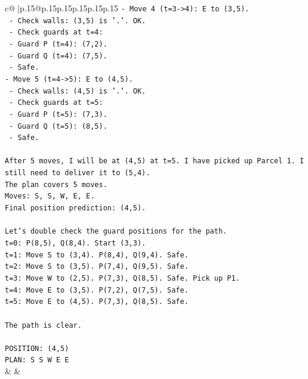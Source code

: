 \documentclass{article}
\begin{document}
{\begin{supertabular}{c@{$\;$}|p{.15\linewidth}@{}p{.15\linewidth}p{.15\linewidth}p{.15\linewidth}p{.15\linewidth}p{.15\linewidth}}
{{{\texttt{{-} Move 4 (t=3{-}>4): E to (3,5).} \\
\texttt{  {-} Check walls: (3,5) is '.'. OK.} \\
\texttt{  {-} Check guards at t=4:} \\
\texttt{    {-} Guard P (t=4): (7,2).} \\
\texttt{    {-} Guard Q (t=4): (7,5).} \\
\texttt{  {-} Safe.} \\
\texttt{{-} Move 5 (t=4{-}>5): E to (4,5).} \\
\texttt{  {-} Check walls: (4,5) is '.'. OK.} \\
\texttt{  {-} Check guards at t=5:} \\
\texttt{    {-} Guard P (t=5): (7,3).} \\
\texttt{    {-} Guard Q (t=5): (8,5).} \\
\texttt{  {-} Safe.} \\
\\ 
\texttt{After 5 moves, I will be at (4,5) at t=5. I have picked up Parcel 1. I still need to deliver it to (5,4).} \\
\texttt{The plan covers 5 moves.} \\
\texttt{Moves: S, S, W, E, E.} \\
\texttt{Final position prediction: (4,5).} \\
\\ 
\texttt{Let's double check the guard positions for the path.} \\
\texttt{t=0: P(8,5), Q(8,4). Start (3,3).} \\
\texttt{t=1: Move S to (3,4). P(8,4), Q(9,4). Safe.} \\
\texttt{t=2: Move S to (3,5). P(7,4), Q(9,5). Safe.} \\
\texttt{t=3: Move W to (2,5). P(7,3), Q(8,5). Safe. Pick up P1.} \\
\texttt{t=4: Move E to (3,5). P(7,2), Q(7,5). Safe.} \\
\texttt{t=5: Move E to (4,5). P(7,3), Q(8,5). Safe.} \\
\\ 
\texttt{The path is clear.} \\
\\ 
\texttt{POSITION: (4,5)} \\
\texttt{PLAN: S S W E E} \\
            }
        }
    }
    & & \\ \\


\end{supertabular}}
\end{document}
